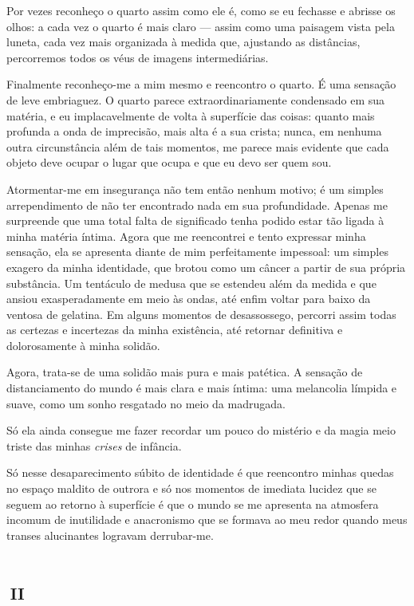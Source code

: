 Por vezes reconheço o quarto assim como ele é, como se eu fechasse e abrisse os olhos: a cada vez o quarto é mais claro --- assim como uma paisagem vista pela luneta, cada vez mais organizada à medida que, ajustando as distâncias, percorremos todos os véus de imagens intermediárias.

Finalmente reconheço-me a mim mesmo e reencontro o quarto. É uma sensação de leve embriaguez. O quarto parece extraordinariamente condensado em sua matéria, e eu implacavelmente de volta à superfície das coisas: quanto mais profunda a onda de imprecisão, mais alta é a sua crista; nunca, em nenhuma outra circunstância além de tais momentos, me parece mais evidente que cada objeto deve ocupar o lugar que ocupa e que eu devo ser quem sou.

Atormentar-me em insegurança não tem então nenhum motivo; é um simples arrependimento de não ter encontrado nada em sua profundidade. Apenas me surpreende que uma total falta de significado tenha podido estar tão ligada à minha matéria íntima. Agora que me reencontrei e tento expressar minha sensação, ela se apresenta diante de mim perfeitamente impessoal: um simples exagero da minha identidade, que brotou como um câncer a partir de sua própria substância. Um tentáculo de medusa que se estendeu além da medida e que ansiou exasperadamente em meio às ondas, até enfim voltar para baixo da ventosa de gelatina. Em alguns momentos de desassossego, percorri assim todas as certezas e incertezas da minha existência, até retornar definitiva e dolorosamente à minha solidão.

Agora, trata-se de uma solidão mais pura e mais patética. A sensação de distanciamento do mundo é mais clara e mais íntima: uma melancolia límpida e suave, como um sonho resgatado no meio da madrugada.

Só ela ainda consegue me fazer recordar um pouco do mistério e da magia meio triste das minhas \textit{crises} de infância.

Só nesse desaparecimento súbito de identidade é que reencontro minhas quedas no espaço maldito de outrora e só nos momentos de imediata lucidez que se seguem ao retorno à superfície é que o mundo se me apresenta na atmosfera incomum de inutilidade e anacronismo que se formava ao meu redor quando meus transes alucinantes logravam derrubar-me.


\chapter*{\small{}\,\Large\centering\textsc{ii}\,\small{}}

